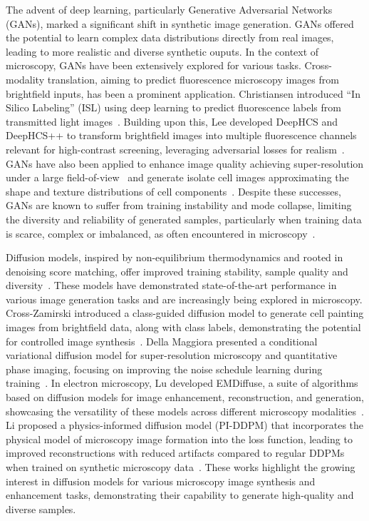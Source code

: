 The advent of deep learning, particularly Generative Adversarial Networks (GANs), marked a significant shift in synthetic image generation.
GANs offered the potential to learn complex data distributions directly from real images, leading to more realistic and diverse synthetic ouputs.
In the context of microscopy, GANs have been extensively explored for various tasks.
Cross-modality translation, aiming to predict fluorescence microscopy images from brightfield inputs, has been a prominent application.
Christiansen \etal introduced ``In Silico Labeling'' (ISL) using deep learning to predict fluorescence labels from transmitted light images~\cite{christiansen_silico_2018}.
Building upon this, Lee \etal developed DeepHCS and DeepHCS++ to transform brightfield images into multiple fluorescence channels relevant for high-contrast screening, leveraging adversarial losses for realism~\cite{gyuhyun_lee_deephcs_2018,gyuhyun_lee_deephcs_2021}.
GANs have also been applied to enhance image quality achieving super-resolution under a large field-of-view~\cite{zhang_high-throughput_2019} and generate isolate cell images approximating the shape and texture distributions of cell components~\cite{marin_scalbert_generic_2019}.
Despite these successes, GANs are known to suffer from training instability and mode collapse, limiting the diversity and reliability of generated samples, particularly when training data is scarce, complex or imbalanced, as often encountered in microscopy~\cite{juan_c_caicedo_evaluation_2019,ricard_durall_combating_2020}.


Diffusion models, inspired by non-equilibrium thermodynamics and rooted in denoising score matching, offer improved training stability, sample quality and diversity~\cite{jascha_sohl-dickstein_deep_2015,ho_denoising_2020,song_denoising_2020}.
These models have demonstrated state-of-the-art performance in various image generation tasks and are increasingly being explored in microscopy.
Cross-Zamirski \etal introduced a class-guided diffusion model to generate cell painting images from brightfield data, along with class labels, demonstrating the potential for controlled image synthesis~\cite{cross-zamirski_class-guided_2023}.
Della Maggiora \etal presented a conditional variational diffusion model for super-resolution microscopy and quantitative phase imaging, focusing on improving the noise schedule learning during training~\cite{gabriel_della_maggiora_conditional_2023}.
In electron microscopy, Lu \etal developed EMDiffuse, a suite of algorithms based on diffusion models for image enhancement, reconstruction, and generation, showcasing the versatility of these models across different microscopy modalities~\cite{lu_diffusion-based_2024}.
Li \etal proposed a physics-informed diffusion model (PI-DDPM) that incorporates the physical model of microscopy image formation into the loss function, leading to improved reconstructions with reduced artifacts compared to regular DDPMs when trained on synthetic microscopy data~\cite{li_microscopy_2023}.
These works highlight the growing interest in diffusion models for various microscopy image synthesis and enhancement tasks, demonstrating their capability to generate high-quality and diverse samples.

